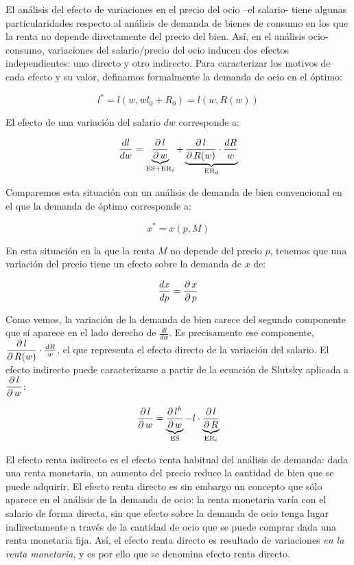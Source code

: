 \documentclass{nuevotema}
\begin{document}
\conceptos 


El análisis del efecto de variaciones en el precio del ocio --el salario- tiene algunas particularidades respecto al análisis de demanda de bienes de consumo en los que la renta no depende directamente del precio del bien. Así, en el análisis ocio-consumo, variaciones del salario/precio del ocio inducen dos efectos independientes: uno directo y otro indirecto. Para caracterizar los motivos de cada efecto y su valor, definamos formalmente la demanda de ocio en el óptimo:

\begin{equation*}
	l^* = l(w, w l_0 + R_0) = l(w, R(w))
\end{equation*}

El efecto de una variación del salario $d w$ corresponde a:

\begin{equation*}
	\frac{dl}{dw} = \underbrace{\dfrac{\partial \, l}{\partial \, w}}_{\text{ES}+\text{ER}_i} + \underbrace{\dfrac{\partial \, l}{\partial \, R(w)} \cdot \frac{d R}{w}}_{\text{ER}_d}
\end{equation*}

Comparemos esta situación con un análisis de demanda de bien convencional en el que la demanda de óptimo corresponde a:

\begin{equation*}
	x^* = x(p, M)
\end{equation*}

En esta situación en la que la renta $M$ no depende del precio $p$, tenemos que una variación del precio tiene un efecto sobre la demanda de $x$ de:

\begin{equation*}
	\frac{d x}{d p} = \dfrac{\partial \, x}{\partial \, p}
\end{equation*}

Como vemos, la variación de la demanda de bien carece del segundo componente que sí aparece en el lado derecho de $\frac{dl}{dw}$. Es precisamente ese componente, $\dfrac{\partial \, l}{\partial \, R(w)} \cdot \frac{d R}{w}$, el que representa el efecto directo de la variación del salario. El efecto indirecto puede caracterizarse a partir de la ecuación de Slutsky aplicada a $\dfrac{\partial \, l}{\partial \, w}$:

\begin{equation*}
	\dfrac{\partial \, l}{\partial \, w} = \underbrace{\dfrac{\partial \, l^h}{\partial \, w}}_{\text{ES}} - l \cdot \underbrace{\dfrac{\partial \, l}{\partial \, R}}_{\text{ER}_i}
\end{equation*}

El efecto renta indirecto es el efecto renta habitual del análisis de demanda: dada una renta monetaria, un aumento del precio reduce la cantidad de bien que se puede adquirir. El efecto renta directo es sin embargo un concepto que sólo aparece en el análisis de la demanda de ocio: la renta monetaria varía con el salario de forma directa, sin que efecto sobre la demanda de ocio tenga lugar indirectamente a través de la cantidad de ocio que se puede comprar dada una renta monetaria fija. Así, el efecto renta directo es resultado de variaciones \textit{en la renta monetaria}, y es por ello que se denomina efecto renta directo. 
\end{document}
